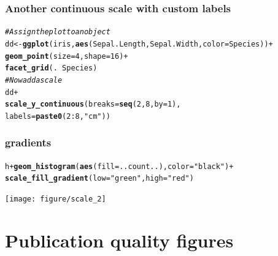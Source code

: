 \documentclass{beamer}\usepackage[]{graphicx}\usepackage[]{color}
\makeatletter
\newcommand{\hlstr}[1]{\textcolor[rgb]{0.192,0.494,0.8}{#1}}%
\newcommand{\hlcom}[1]{\textcolor[rgb]{0.678,0.584,0.686}{\textit{#1}}}%
\newcommand{\hlkwd}[1]{\textcolor[rgb]{0.737,0.353,0.396}{\textbf{#1}}}%
\newenvironment{kframe}{%
 \def\at@end@of@kframe{}%
 \ifinner\ifhmode%
  \def\at@end@of@kframe{\end{minipage}}%
  \begin{minipage}{\columnwidth}%
 \fi\fi%
 \def\FrameCommand##1{\hskip\@totalleftmargin \hskip-\fboxsep
 \colorbox{shadecolor}{##1}\hskip-\fboxsep
     \hskip-\linewidth \hskip-\@totalleftmargin \hskip\columnwidth}%
 \MakeFramed {\advance\hsize-\width
   \@totalleftmargin\z@ \linewidth\hsize
   \@setminipage}}%
 {\par\unskip\endMakeFramed%
 \at@end@of@kframe}
\newenvironment{knitrout}{}{} %
\makeatother
\begin{document}

\begin{frame}[fragile]
\frametitle{Another continuous scale with custom labels}
\begin{knitrout}\footnotesize
{}\color{fgcolor}\begin{kframe}
\begin{alltt}
\hlcom{# Assign the plot to an object}
dd <- \hlkwd{ggplot}(iris, \hlkwd{aes}(Sepal.Length, Sepal.Width, color = Species)) +
\hlkwd{geom_point}(size = 4, shape = 16) +
\hlkwd{facet_grid}(. ~Species)
\hlcom{# Now add a scale}
dd +
\hlkwd{scale_y_continuous}(breaks = \hlkwd{seq}(2, 8, by = 1),
labels = \hlkwd{paste0}(2:8, \hlstr{" cm"}))
\end{alltt}
\end{kframe}
\end{knitrout}

\end{frame}


\begin{frame}[fragile]
\frametitle{gradients}
\begin{knitrout}\footnotesize
{}\color{fgcolor}\begin{kframe}
\begin{alltt}
h + \hlkwd{geom_histogram}( \hlkwd{aes}(fill = ..count..), color=\hlstr{"black"}) +
\hlkwd{scale_fill_gradient}(low=\hlstr{"green"}, high=\hlstr{"red"})
\end{alltt}
\end{kframe}

{\centering \texttt{[image: figure/scale\_2]} 

}



\end{knitrout}

\end{frame}


\section*{Publication quality figures}
\frame{\sectionpage}
\end{document}
